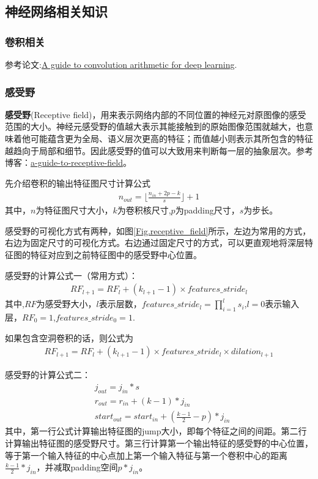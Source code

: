\documentclass{article}
\begin{document}
\subsection{神经网络相关知识}
\subsubsection{卷积相关}
参考论文:\href{https://arxiv.org/pdf/1603.07285.pdf}{A guide to convolution arithmetic for deep learning}.
\subsubsection{感受野}
\textbf{感受野}(Receptive field)，用来表示网络内部的不同位置的神经元对原图像的感受范围的大小。神经元感受野的值越大表示其能接触到的原始图像范围就越大，也意味着他可能蕴含更为全局、语义层次更高的特征；而值越小则表示其所包含的特征越趋向于局部和细节。因此感受野的值可以大致用来判断每一层的抽象层次。参考博客：\href{https://blog.mlreview.com/a-guide-to-receptive-field-arithmetic-for-convolutional-neural-networks-e0f514068807}{a-guide-to-receptive-field}。

先介绍卷积的输出特征图尺寸计算公式
\begin{align}
n_{out} = \lfloor \frac{n_{in}+2p - k}{s} \rfloor + 1
\end{align}
其中，$n$为特征图尺寸大小，$k$为卷积核尺寸,$p$为padding尺寸，$s$为步长。

感受野的可视化方式有两种，如图\ref{Fig.receptive_field}所示，左边为常用的方式，右边为固定尺寸的可视化方式。右边通过固定尺寸的方式，可以更直观地将深层特征图的特征对应到之前特征图中的感受野中心位置。


感受野的计算公式一（常用方式）：
\begin{align}
RF_{l+1} = RF_l + (k_{l+1} -1) \times features\_stride_l
\end{align}
其中,$RF$为感受野大小，$l$表示层数，$features\_stride_l = \prod_{i=1}^l s_i$,$l=0$表示输入层，$RF_0=1$,$features\_stride_0=1$.

如果包含空洞卷积的话，则公式为
\begin{align}
RF_{l+1} = RF_l + (k_{l+1} -1) \times features\_stride_l \times dilation_{l+1}
\end{align}

感受野的计算公式二：
\begin{equation}
\begin{aligned}
& j_{out} = j_{in} * s \\
& r_{out} = r_{in} + (k -1) * j_{in} \\
& start_{out} = start_{in} + (\frac{k-1}{2} -p) * j_{in}
\end{aligned}
\end{equation}
其中，第一行公式计算输出特征图的jump大小，即每个特征之间的间距。第二行计算输出特征图的感受野尺寸。第三行计算第一个输出特征的感受野的中心位置，等于第一个输入特征的中心点加上第一个输入特征与第一个卷积中心的距离$\frac{k-1}{2}* j_{in}$，并减取padding空间$p*j_{in}$。
\end{document}
